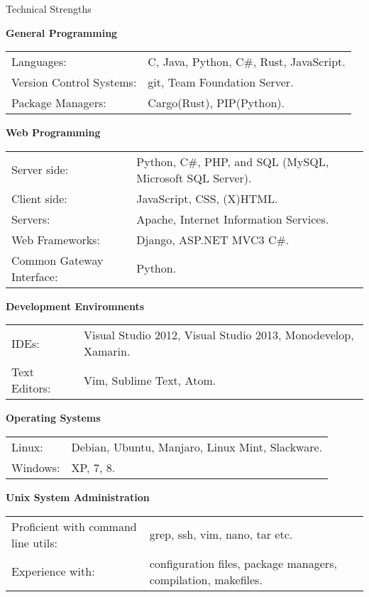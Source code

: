 \documentclass{resume} %
\newcommand{\btab}[2]{
	\bgroup
	\def\arraystretch{#1}
	\begin{tabular}{#2}
}
\newcommand{\etab}{
	\end{tabular} \smallskip
	\egroup
}
\begin{document}
\begin{rSection}{Technical Strengths}

{\bf General Programming}

\btab{1.1}{ l l }
	Languages: & C, Java, Python, C\#, Rust, JavaScript. \\
	Version Control Systems: & git, Team Foundation Server. \\
	Package Managers: & Cargo(Rust), PIP(Python). \\
\etab

{\bf Web Programming}

\btab{1.1}{ l l }
	Server side: & Python, C\#, PHP, and SQL (MySQL, Microsoft SQL Server). \\
	Client side: & JavaScript, CSS, (X)HTML. \\
	Servers: & Apache, Internet Information Services. \\
	Web Frameworks: & Django, ASP.NET MVC3 C\#. \\
	Common Gateway Interface: & Python. \\
\etab

{\bf Development Enviromnents}

\btab{1.1}{ l l }
    IDEs: & Visual Studio 2012, Visual Studio 2013, Monodevelop, Xamarin. \\
	Text Editors: & Vim, Sublime Text, Atom. \\
\etab

{\bf Operating Systems}

\btab{1.1}{ l l }
	Linux: & Debian, Ubuntu, Manjaro, Linux Mint, Slackware. \\
	Windows: & XP, 7, 8. \\
\etab

{\bf Unix System Administration}

\btab{1.1}{ l l }
	Proficient with command line utils: & grep, ssh, vim, nano, tar etc. \\
	Experience with: & configuration files, package managers, compilation, makefiles. \\
\etab

\end{rSection}
\end{document}
